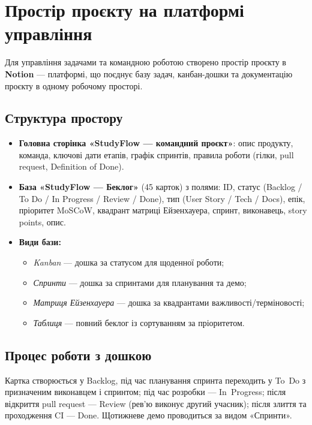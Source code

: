 \documentclass[12pt]{article}
\begin{document}
\section{Простір проєкту на платформі управління}
Для управління задачами та командною роботою створено простір проєкту в \textbf{Notion} --- платформі, що поєднує базу задач, канбан-дошки та документацію проєкту в одному робочому просторі.

\subsection{Структура простору}
\begin{itemize}[leftmargin=1.5em]
  \item \textbf{Головна сторінка «StudyFlow --- командний проєкт»}: опис продукту, команда, ключові дати етапів, графік спринтів, правила роботи (гілки, pull request, Definition of Done).
  \item \textbf{База «StudyFlow --- Беклог»} (45 карток) з полями: ID, статус (Backlog / To Do / In Progress / Review / Done), тип (User Story / Tech / Docs), епік, пріоритет MoSCoW, квадрант матриці Ейзенхауера, спринт, виконавець, story points, опис.
  \item \textbf{Види бази:}
  \begin{itemize}[nosep]
    \item \emph{Kanban} --- дошка за статусом для щоденної роботи;
    \item \emph{Спринти} --- дошка за спринтами для планування та демо;
    \item \emph{Матриця Ейзенхауера} --- дошка за квадрантами важливості/терміновості;
    \item \emph{Таблиця} --- повний беклог із сортуванням за пріоритетом.
  \end{itemize}
\end{itemize}

\subsection{Процес роботи з дошкою}
Картка створюється у Backlog, під час планування спринта переходить у To~Do з призначеним виконавцем і спринтом; під час розробки --- In~Progress; після відкриття pull request --- Review (рев'ю виконує другий учасник); після злиття та проходження CI --- Done. Щотижневе демо проводиться за видом «Спринти».
\end{document}
